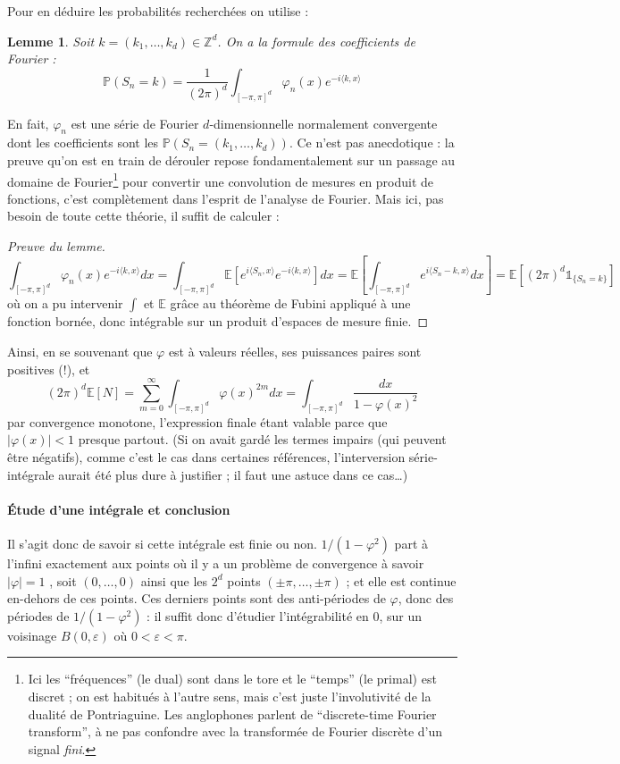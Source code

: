 \documentclass[a4paper, 11pt]{article}
\def\Z{\mathbb{Z}}
\def\P{\mathbb{P}}
\def\E{\mathbb{E}}
\def\Indic{\mathbb{1}}
\newtheorem*{lemma}{Lemme}
\begin{document}
Pour en déduire les probabilités recherchées on utilise :
\begin{lemma} Soit $k = (k_1, \ldots, k_d) \in \Z^d$. On a la formule des
  coefficients de Fourier :
 \[ \displaystyle \P(S_n = k) = \frac{1}{(2\pi)^d} \int_{[-\pi,\pi]^d} \varphi_n(x)e^{-i\langle k,x \rangle} \]
\end{lemma}
En fait, $\varphi_n$ est une série de Fourier $d$-dimensionnelle normalement
convergente dont les coefficients sont les $\P(S_n = (k_1, \ldots, k_d))$. Ce
n'est pas anecdotique : la preuve qu'on est en train de dérouler repose
fondamentalement sur un passage au domaine de Fourier\footnote{Ici les
  \enquote{fréquences} (le dual) sont dans le tore et le \enquote{temps} (le
  primal) est discret ; on est habitués à l'autre sens, mais c'est juste
  l'involutivité de la dualité de Pontriaguine. Les anglophones parlent de
  \enquote{discrete-time Fourier transform}, à ne pas confondre avec la
  transformée de Fourier discrète d'un signal \emph{fini}.} pour convertir une
convolution de mesures en produit de fonctions, c'est complètement dans l'esprit
de l'analyse de Fourier. Mais ici, pas besoin de toute cette théorie, il suffit
de calculer :
\begin{proof}[Preuve du lemme]
  \[ \int_{[-\pi,\pi]^d} \varphi_n(x)e^{-i\langle k,x \rangle} dx =
    \int_{[-\pi,\pi]^d} \E\left[ e^{i\langle S_n, x \rangle} e^{-i\langle k,x
        \rangle}\right] dx
    = \E\left[ \int_{[-\pi,\pi]^d} e^{i\langle S_n - k, x \rangle} dx \right]
    = \E\left[ (2\pi)^d \Indic_{\{S_n = k\}} \right] \]
  où on a pu intervenir $\int$ et $\E$ grâce au théorème de Fubini appliqué à
  une fonction bornée, donc intégrable sur un produit d'espaces de mesure finie.
\end{proof}
Ainsi, en se souvenant que $\varphi$ est à valeurs réelles, ses puissances
paires sont positives (!), et
\[ (2\pi)^d \E[N] = \sum_{m=0}^{\infty} \int_{[-\pi,\pi]^d} \varphi(x)^{2m} dx
  = \int_{[-\pi,\pi]^d} \frac{dx}{1 - \varphi(x)^2}\]
par convergence monotone, l'expression finale étant valable parce que
$|\varphi(x)| < 1$ presque partout. (Si on avait gardé les termes impairs (qui
peuvent être négatifs), comme c'est le cas dans certaines références,
l'interversion série-intégrale aurait été plus dure à justifier ; il faut une
astuce dans ce cas…)

\paragraph{Étude d'une intégrale et conclusion} Il s'agit donc de savoir si
cette intégrale est finie ou non. $1/(1-\varphi^2)$ part à l'infini exactement
aux points où il y a un problème de convergence à savoir $|\varphi| = 1$ , soit
$(0,\ldots,0)$ ainsi que les $2^d$ points $(\pm \pi, \ldots, \pm \pi)$ ; et elle
est continue en-dehors de ces points. Ces derniers points sont des anti-périodes
de $\varphi$, donc des périodes de $1/(1-\varphi^2)$ : il suffit donc d'étudier
l'intégrabilité en 0, sur un voisinage $B(0,\varepsilon)$ où $0 < \varepsilon <
\pi$.
\end{document}
